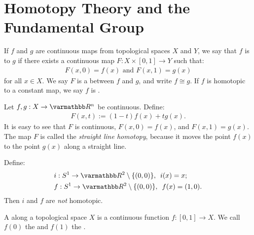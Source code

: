 \chapter{Homotopy Theory and the Fundamental Group}

\begin{definition}
    If $f$ and $g$ are continuous maps from topological spaces $X$ and $Y$, we say that $f$ is  to $g$ if there exists a continuous map $F:X \times [0,1] \rightarrow Y$ such that:
        \begin{equation*}
        \begin{split}
            F(x,0) = f(x) \text{ and }F(x,1) = g(x)
        \end{split}
        \end{equation*}
    for all $x \in X$. We say $F$ is a  between $f$ and $g$, and write $f \cong g$. If $f$ is homotopic to a constant map, we say $f$ is .
\end{definition}

\begin{example}
    Let $f,g:X \rightarrow \bfR^n$ be continuous. Define:
        \begin{equation*}
        \begin{split}
            F(x,t) := (1-t)f(x) + tg(x). 
        \end{split}
        \end{equation*} 
    It is easy to see that $F$ is continuous, $F(x,0) = f(x)$, and $F(x,1) = g(x)$. The map $F$ is called the \textit{straight line homotopy}, because it moves the point $f(x)$ to the point $g(x)$ along a straight line.
\end{example}

\begin{example}
    Define:
        \begin{equation*}
        \begin{split}
            &i:S^1 \rightarrow \bfR^2 \setminus\{(0,0)\}, \h5 i(x) = x;\\
            &f:S^1 \rightarrow \bfR^2 \setminus\{(0,0)\},\h5 f(x) = (1,0).
        \end{split}
        \end{equation*}
    Then $i$ and $f$ are \textit{not} homotopic.
\end{example}

\begin{definition}
    A  along a topological space $X$ is a continuous function $f:[0,1] \rightarrow X$. We call $f(0)$ the  and $f(1)$ the .
\end{definition}

